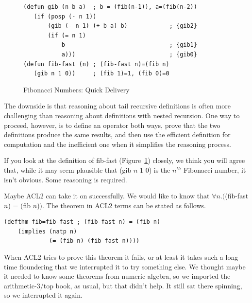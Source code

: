 \begin{figure}
\begin{center}
\begin{Verbatim}
(defun gib (n b a)  ; b = (fib(n-1)), a=(fib(n-2))
   (if (posp (- n 1))
       (gib (- n 1) (+ b a) b)            ; {gib2}
       (if (= n 1)
           b                              ; {gib1}
           a)))                           ; {gib0}
(defun fib-fast (n) ; (fib-fast n)=(fib n)
   (gib n 1 0))     ; (fib 1)=1, (fib 0)=0
\end{Verbatim}
\end{center}
\caption{Fibonacci Numbers: Quick Delivery}
\label{fig:gib-defun}
\end{figure}

The downside is that reasoning
about tail recursive
definitions is often more challenging than reasoning about definitions
with nested recursion. One way to proceed, however,
is to define an operator both ways, prove that the two definitions
produce the same results, and then use the efficient definition
for computation and the inefficient one when it
simplifies the reasoning process.

If you look at the definition of fib-fast (Figure~\ref{fig:gib-defun})
closely, we think you will agree that, while it may seem plausible
that (gib $n$ $1$ $0$) is the $n^{th}$ Fibonacci number,
it isn't obvious.
Some reasoning is required.

Maybe ACL2 can take it on successfully.
We would like to know that $\forall n.($(fib-fast $n$) = (fib $n$)$)$.
The theorem in ACL2 terms can be stated as follows.
\begin{samepage}
\begin{center}
\begin{Verbatim}
(defthm fib=fib-fast ; (fib-fast n) = (fib n)
    (implies (natp n)
             (= (fib n) (fib-fast n))))
\end{Verbatim}
\end{center}
\end{samepage}

When ACL2 tries to prove this theorem it fails,
or at least it takes such a long time floundering that we interrupted it
to try something else.
We thought maybe it needed to know some theorems from numeric
algebra, so we imported the arithmetic-3/top book, as usual,
but that didn't help. It still sat there spinning,
so we interrupted it again.

